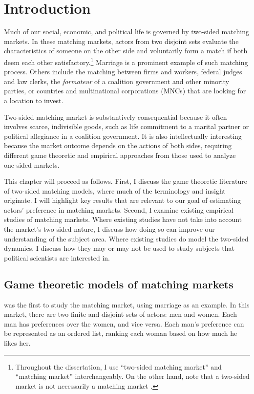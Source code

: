 \chapter{Introduction}

Much of our social, economic, and political life is governed by two-sided
matching markets. In these matching markets, actors from two disjoint sets
evaluate the characteristics of someone on the other side and voluntarily form a
match if both deem each other satisfactory.\footnote{Throughout the
  dissertation, I use ``two-sided matching market'' and ``matching market''
  interchangeably. On the other hand, note that a two-sided market is not
  necessarily a matching market \citep{Rysman2009}.} Marriage is a prominent
example of such matching process. Others include the matching between firms and
workers, federal judges and law clerks, the \textit{formateur} of a coalition
government and other minority parties, or countries and multinational
corporations (MNCs) that are looking for a location to invest.

Two-sided matching market is substantively consequential because it often
involves scarce, indivisible goods, such as life commitment to a marital partner
or political allegiance in a coalition government. It is also intellectually
interesting because the market outcome depends on the actions of both sides,
requiring different game theoretic and empirical approaches from those used to
analyze one-sided markets.

This chapter will proceed as follows. First, I discuss the game theoretic
literature of two-sided matching models, where much of the terminology and
insight originate. I will highlight key results that are relevant to our goal of
estimating actors' preference in matching markets. Second, I examine existing
empirical studies of matching markets. Where existing studies have not take into
account the market's two-sided nature, I discuss how doing so can improve our
understanding of the subject area. Where existing studies do model the two-sided
dynamics, I discuss how they may or may not be used to study subjects that
political scientists are interested in.

\section{Game theoretic models of matching markets}
\label{sec:game_theory}

\citet{Gale1962} was the first to study the matching market, using marriage as
an example. In this market, there are two finite and disjoint sets of actors:
men and women. Each man has preferences over the women, and vice versa. Each
man's preference can be represented as an ordered list, ranking each woman based
on how much he likes her.

